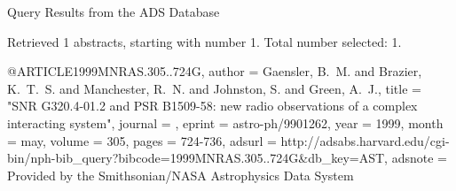 Query Results from the ADS Database


Retrieved 1 abstracts, starting with number 1.  Total number selected: 1.

@ARTICLE{1999MNRAS.305..724G,
   author = {{Gaensler}, B.~M. and {Brazier}, K.~T.~S. and {Manchester}, R.~N. and 
	{Johnston}, S. and {Green}, A.~J.},
    title = "{SNR G320.4-01.2 and PSR B1509-58: new radio observations of a complex interacting system}",
  journal = {\mnras},
   eprint = {astro-ph/9901262},
     year = 1999,
    month = may,
   volume = 305,
    pages = {724-736},
   adsurl = {http://adsabs.harvard.edu/cgi-bin/nph-bib_query?bibcode=1999MNRAS.305..724G&db_key=AST},
  adsnote = {Provided by the Smithsonian/NASA Astrophysics Data System}
}


